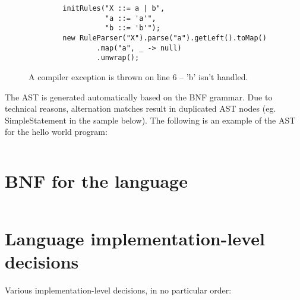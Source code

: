 \documentclass{article}
\def\bnflexer{grammar_notation.py:AbnfLexer -x}
\newcommand{\bnf}[1]{%
    \inputminted{\bnflexer}{#1}}
\begin{document}
\begin{figure}[ht!]
    \begin{verbatim}
        initRules("X ::= a | b",
                  "a ::= 'a'",
                  "b ::= 'b'");
        new RuleParser("X").parse("a").getLeft().toMap()
                .map("a", _ -> null)
                .unwrap();
    \end{verbatim}
    \caption{A compiler exception is thrown on line 6 -- 'b' isn't handled.}
\end{figure}

\newpage
The AST is generated automatically based on the BNF grammar. Due to technical
reasons, alternation matches result in duplicated AST nodes (eg.
SimpleStatement in the sample below). The following is an example of the AST
for the hello world program:

\inputminted{text}{ast.txt}


\newpage
\section{BNF for the language}
\label{sec:bnf}
\bnf{../src/main/resources/MinPascal.bnf}

\newpage
\section{Language implementation-level decisions}
Various implementation-level decisions, in no particular order:
\end{document}
